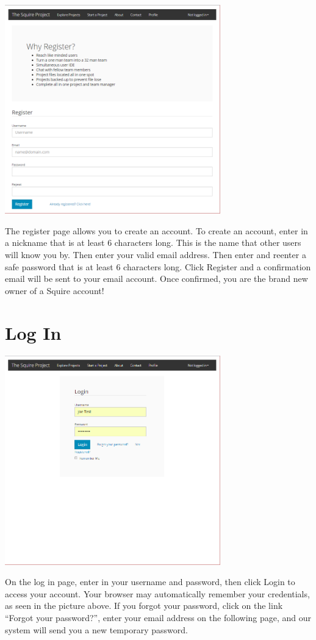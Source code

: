 \documentclass[11pt]{report}
\begin{document}
\pagebreak
	\begin{center}
           \includegraphics[width=0.7\textwidth]{register.png}
    \end{center}
The register page allows you to create an account. To create an account, enter in a nickname that is at least 6 characters long. This is the name that other users will know you by. Then enter your valid email address. Then enter and reenter a safe password that is at least 6 characters long. Click Register and a confirmation email will be sent to your email account. Once confirmed, you are the brand new owner of a Squire account!

\section{Log In}
	\begin{center}
           \includegraphics[width=0.7\textwidth]{login.png}
    \end{center}
On the log in page, enter in your username and password, then click Login to access your account. Your browser may automatically remember your credentials, as seen in the picture above. If you forgot your password, click on the link “Forgot your password?”, enter your email address on the following page, and our system will send you a new temporary password.
\end{document}
